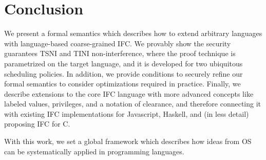 \section{Conclusion}
\label{sec:conclusion}

We present a formal semantics which describes how to extend arbitrary languages
with language-based coarse-grained IFC. We provably show the security guarantees
TSNI and TINI non-interference, where the proof technique is parametrized on the
target language, and it is developed for two ubiquitous scheduling policies. In
addition, we provide conditions to securely refine our formal semantics to
consider optimizations required in practice. Finally, we describe extensions to
the core IFC language with more advanced concepts like labeled values, privileges,
and a notation of clearance, and therefore connecting it with existing
IFC implementations for Javascript, Haskell, and (in
less detail) proposing IFC for C.

With this work, we set a global framework which describes how ideas from
OS can be systematically applied in programming languages. 


